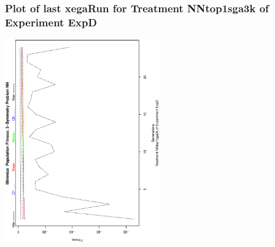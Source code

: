  \begin{frame}
 \frametitle{ Plot of last xegaRun for Treatment NNtop1sga3k of Experiment ExpD }
 \begin{center}
\includegraphics[width=0.5\textwidth, angle=-90]
{ExpDPlotPopStatsFigure001.eps}
 \end{center}
 \label{report/ExpDPlotPopStatsFigure001.eps}  
 \end{frame}


